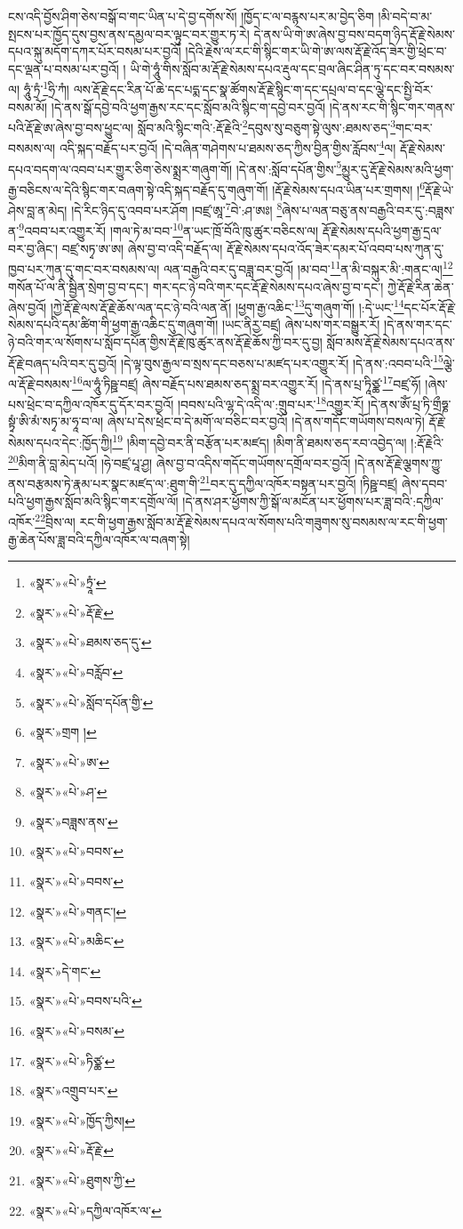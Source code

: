 ངས་འདི་བྱོས་ཤིག་ཅེས་བསྒོ་བ་གང་ཡིན་པ་དེ་བྱ་དགོས་སོ། །ཁྱོད་ང་ལ་བརྙས་པར་མ་བྱེད་ཅིག །མི་བདེ་བ་མ་སྤངས་པར་ཁྱོད་དུས་བྱས་ནས་དམྱལ་བར་ལྟུང་བར་གྱུར་ཏ་རེ། དེ་ནས་ཡི་གེ་ཨ་ཞེས་བྱ་བས་བདག་ཉིད་རྡོ་རྗེ་སེམས་དཔའ་སྐུ་མདོག་དཀར་པོར་བསམ་པར་བྱའོ། །དེའི་རྗེས་ལ་རང་གི་སྙིང་གར་ཡི་གེ་ཨ་ལས་རྡོ་རྗེ་འོད་ཟེར་གྱི་ཕྲེང་བ་དང་ལྡན་པ་བསམ་པར་བྱའོ། །
ཡི་གེ་ཧཱུཾ་གིས་སློབ་མ་རྡོ་རྗེ་སེམས་དཔའ་རྡུལ་དང་བྲལ་ཞིང་ཤིན་ཏུ་དང་བར་བསམས་ལ། ཧཱུཾ་ཏྲཾ་\footnote{«སྣར་»«པེ་»ཏྲཱཾ་}ཧྲི་ཀཾ། ལས་རྡོ་རྗེ་དང་རིན་པོ་ཆེ་དང་པདྨ་དང་སྣ་ཚོགས་རྡོ་རྗེ་སྙིང་ག་དང་དཔྲལ་བ་དང་ལྕེ་དང་སྤྱི་བོར་བསམ་མོ། །དེ་ནས་སྒོ་དབྱེ་བའི་ཕྱག་རྒྱས་རང་དང་སློབ་མའི་སྙིང་ག་དབྱེ་བར་བྱའོ། །དེ་ནས་རང་གི་སྙིང་གར་གནས་པའི་རྡོ་རྗེ་ཨ་ཞེས་བྱ་བས་ཕྱུང་ལ། སློབ་མའི་སྙིང་གའི་:རྡོ་རྗེའི་\footnote{«སྣར་»«པེ་»རྡོ་རྗེ་}དབུས་སུ་བཅུག་སྟེ་ལུས་:ཐམས་ཅད་\footnote{«སྣར་»«པེ་»ཐམས་ཅད་དུ་}གང་བར་བསམས་ལ། འདི་སྐད་བརྗོད་པར་བྱའོ། །དེ་བཞིན་གཤེགས་པ་ཐམས་ཅད་ཀྱིས་བྱིན་གྱིས་རློབས་\footnote{«སྣར་»«པེ་»བརློབ་}ལ། རྡོ་རྗེ་སེམས་དཔའ་བདག་ལ་འབབ་པར་གྱུར་ཅིག་ཅེས་སྨྲར་གཞུག་གོ། །དེ་ནས་:སློབ་དཔོན་གྱིས་\footnote{«སྣར་»«པེ་»སློབ་དཔོན་གྱི་}མྱུར་དུ་རྡོ་རྗེ་སེམས་མའི་ཕྱག་རྒྱ་བཅིངས་ལ་དེའི་སྙིང་གར་བཞག་སྟེ་འདི་སྐད་བརྗོད་དུ་གཞུག་གོ། །རྡོ་རྗེ་སེམས་དཔའ་ཡིན་པར་གྲགས། །\footnote{«སྣར་»གྲག །}རྡོ་རྗེ་ཡེ་ཤེས་བླ་ན་མེད། །དེ་རིང་ཉིད་དུ་འབབ་པར་ཤོག །བཛྲ་ཨཱ་\footnote{«སྣར་»«པེ་»ཨ་}བེ་:ཤ་ཨཿ། \footnote{«སྣར་»«པེ་»ཤ་}ཞེས་པ་ལན་བཅུ་ནས་བརྒྱའི་བར་དུ་:བཟླས་ན་\footnote{«སྣར་»བཟླས་ནས་}འབབ་པར་འགྱུར་རོ། །གལ་ཏེ་མ་བབ་\footnote{«སྣར་»«པེ་»བབས་}ན་ཡང་ཁྲོ་བོའི་ཁུ་ཚུར་བཅིངས་ལ། རྡོ་རྗེ་སེམས་དཔའི་ཕྱག་རྒྱ་དྲལ་བར་བྱ་ཞིང་། བཛྲ་སཏྭ་ཨ་ཨ། ཞེས་བྱ་བ་འདི་བརྗོད་ལ། རྡོ་རྗེ་སེམས་དཔའ་འོད་ཟེར་དམར་པོ་འབབ་པས་ཀུན་དུ་ཁྱབ་པར་ཀུན་དུ་གང་བར་བསམས་ལ། ལན་བརྒྱའི་བར་དུ་བཟླ་བར་བྱའོ། །མ་བབ་\footnote{«སྣར་»«པེ་»བབས་}ན་མི་བསྐུར་མི་:གནང་ལ།\footnote{«སྣར་»«པེ་»གནང་།} གསོན་པོ་ལ་ནི་སྦྱིན་སྲེག་བྱ་བ་དང་། གར་དང་ཉེ་བའི་གར་དང་རྡོ་རྗེ་སེམས་དཔའ་ཞེས་བྱ་བ་དང་། ཀྱེ་རྡོ་རྗེ་རིན་ཆེན་ཞེས་བྱའོ། །ཀྱེ་རྡོ་རྗེ་ལས་རྡོ་རྗེ་ཆོས་ལན་དང་ཉེ་བའི་ལན་ནོ། །ཕྱག་རྒྱ་འཆིང་\footnote{«སྣར་»«པེ་»མཆིང་}དུ་གཞུག་གོ། །:དེ་ཡང་\footnote{«སྣར་»དེ་གང་}དང་པོར་རྡོ་རྗེ་སེམས་དཔའི་དམ་ཚིག་གི་ཕྱག་རྒྱ་འཆིང་དུ་གཞུག་གོ། །ཡང་ནིརྱ་བཛྲ། ཞེས་པས་གར་བསྒྱུར་རོ། །དེ་ནས་གར་དང་ཉེ་བའི་གར་ལ་སོགས་པ་སློབ་དཔོན་གྱིས་རྡོ་རྗེ་ཁུ་ཚུར་ནས་རྡོ་རྗེ་ཆོས་ཀྱི་བར་དུ་བྱ། སློབ་མས་རྡོ་རྗེ་སེམས་དཔའ་ནས་རྡོ་རྗེ་བཞད་པའི་བར་དུ་བྱའོ། །དེ་ལྟ་བུས་རྒྱལ་བ་སྲས་དང་བཅས་པ་མཛད་པར་འགྱུར་རོ། །དེ་ནས་:འབབ་པའི་\footnote{«སྣར་»«པེ་»བབས་པའི་}ལྕེ་ལ་རྡོ་རྗེ་བསམས་\footnote{«སྣར་»«པེ་»བསམ་}ལ་ཧཱུཾ་ཏིཥྛ་བཛྲ། ཞེས་བརྗོད་པས་ཐམས་ཅད་སྨྲ་བར་འགྱུར་རོ། །དེ་ནས་པྲ་ཏཱིཙྪ་\footnote{«སྣར་»«པེ་»ཏིཙྪ་}བཛྲ་ཧོ། །ཞེས་པས་ཕྲེང་བ་དཀྱིལ་འཁོར་དུ་དོར་བར་བྱའོ། །བབས་པའི་ལྷ་དེ་འདི་ལ་:གྲུབ་པར་\footnote{«སྣར་»འགྲུབ་པར་}འགྱུར་རོ། །དེ་ནས་ཨོཾ་པྲ་ཏི་གྲྀཧྞ་སྟྭཾ་ཨི་མཾ་སཏྭ་མ་ཧཱ་བ་ལ། ཞེས་པ་དེས་ཕྲེང་བ་དེ་མགོ་ལ་བཅིང་བར་བྱའོ། །དེ་ནས་གདོང་གཡོགས་བསལ་ཏེ། རྡོ་རྗེ་སེམས་དཔའ་དེང་:ཁྱོད་ཀྱི།\footnote{«སྣར་»«པེ་»ཁྱོད་ཀྱིས།} །མིག་དབྱེ་བར་ནི་བརྩོན་པར་མཛད། །མིག་ནི་ཐམས་ཅད་རབ་འབྱེད་ལ། །:རྡོ་རྗེའི་\footnote{«སྣར་»«པེ་»རྡོ་རྗེ་}མིག་ནི་བླ་མེད་པའོ། །ཧེ་བཛྲ་པཱ་ཤྱ། ཞེས་བྱ་བ་འདིས་གདོང་གཡོགས་དགྲོལ་བར་བྱའོ། །དེ་ནས་རྡོ་རྗེ་ལྕགས་ཀྱུ་ནས་བརྩམས་ཏེ་རྣམ་པར་སྣང་མཛད་ལ་:ཐུག་གི་\footnote{«སྣར་»«པེ་»ཐུགས་ཀྱི་}བར་དུ་དཀྱིལ་འཁོར་བསྟན་པར་བྱའོ། །ཏིཥྛ་བཛྲ། ཞེས་དབབ་པའི་ཕྱག་རྒྱས་སློབ་མའི་སྙིང་གར་དགྲོལ་ལོ། །དེ་ནས་ཤར་ཕྱོགས་ཀྱི་སྒོ་ལ་མངོན་པར་ཕྱོགས་པར་ཟླ་བའི་:དཀྱིལ་འཁོར་\footnote{«སྣར་»«པེ་»དཀྱིལ་འཁོར་ལ་}བྲིས་ལ། རང་གི་ཕྱག་རྒྱས་སློབ་མ་རྡོ་རྗེ་སེམས་དཔའ་ལ་སོགས་པའི་གཟུགས་སུ་བསམས་ལ་རང་གི་ཕྱག་རྒྱ་ཆེན་པོས་ཟླ་བའི་དཀྱིལ་འཁོར་ལ་བཞག་སྟེ། 
